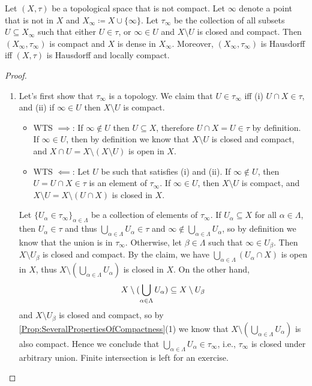 \documentclass[screen,single]{techreport}
\numberwithin{equation}{section}
\begin{document}
\begin{theorem}\label{The:AlexandroffCompactification}
	Let $(X,\tau)$ be a topological space that is not compact.
	Let $\infty$ denote a point that is not in $X$ and $X_\infty \coloneqq X \cup \{\infty\}$.
	Let $\tau_\infty$ be the collection of all subsets $U \subseteq X_\infty$ such that either $U \in \tau$, or $\infty \in U$ and $X \setminus U$ is closed and compact.
	Then $(X_\infty,\tau_\infty)$ is compact and $X$ is dense in $X_\infty$.
	Moreover, $(X_\infty,\tau_\infty)$ is Hausdorff iff $(X,\tau)$ is Hausdorff and locally compact.
\end{theorem}
\begin{proof}\
	\begin{enumerate}
		\item Let's first show that $\tau_\infty$ is a topology.
		We claim that $U \in \tau_\infty$ iff (i) $U \cap X \in \tau$, and (ii) if $\infty \in U$ then $X \setminus U$ is compact.
		\begin{itemize}
			\item WTS ${\implies}$: If $\infty \not\in U$ then $U \subseteq X$, therefore $U \cap X = U \in \tau$ by definition.
			If $\infty \in U$, then by definition we know that $X \setminus U$ is closed and compact, and $X \cap U = X \setminus (X \setminus U)$ is open in $X$.
			\item WTS $\impliedby$: Let $U$ be such that satisfies (i) and (ii).
			If $\infty \not\in U$, then $U = U \cap X \in \tau$ is an element of $\tau_\infty$.
			If $\infty \in U$, then $X \setminus U$ is compact, and $X \setminus U = X \setminus (U \cap X)$ is closed in $X$.
		\end{itemize}
		Let $\{ U_\alpha \in \tau_\infty\}_{\alpha \in \Lambda}$ be a collection of elements of $\tau_\infty$.
		If $U_\alpha \subseteq X$ for all $\alpha \in \Lambda$, then $U_\alpha \in \tau$ and thus $\bigcup_{\alpha \in \Lambda} U_\alpha \in \tau$ and $\infty \not\in \bigcup_{\alpha \in \Lambda} U_\alpha$, so by definition we know that the union is in $\tau_\infty$.
		Otherwise, let $\beta \in \Lambda$ such that $\infty \in U_\beta$.
		Then $X \setminus U_\beta$ is closed and compact.
		By the claim, we have $\bigcup_{\alpha \in \Lambda} (U_\alpha \cap X)$ is open in $X$, thus $X \setminus (\bigcup_{\alpha \in \Lambda} U_\alpha)$ is closed in $X$.
		On the other hand,
		\[
		X \setminus ({\bigcup_{\alpha \in \Lambda} U_\alpha}) \subseteq X \setminus U_\beta
		\]
		and $X \setminus U_\beta$ is closed and compact, so by \cref{Prop:SeveralPropertiesOfCompactness}(1) we know that $X \setminus (\bigcup_{\alpha \in \Lambda} U_\alpha)$ is also compact.
		Hence we conclude that $\bigcup_{\alpha \in \Lambda} U_\alpha \in \tau_\infty$, i.e., $\tau_\infty$ is closed under arbitrary union.
		Finite intersection is left for an exercise.
		

\end{enumerate}
\end{proof}
\end{document}
